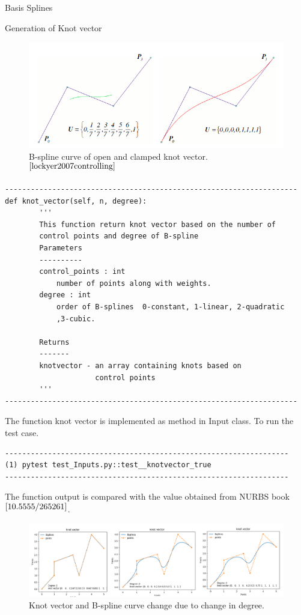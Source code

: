 \documentclass[a4paper,12pt,times]{article}
\begin{document}
\begin{section}{Basis Splines}
\begin{subsection}{Generation of Knot vector}
\begin{figure}[h!]
\centering
\includegraphics[width=0.75\linewidth]{knot_vector_clamped_unclamped.png}
\caption{B-spline curve of open and clamped knot vector.$^{\cite{lockyer2007controlling}}$}
\label{fig:B-spline curve of evenly space open clamped knot vector}
\end{figure}
\begin{verbatim} 
--------------------------------------------------------------------
def knot_vector(self, n, degree):
        '''
        This function return knot vector based on the number of
        control points and degree of B-spline
        Parameters
        ----------
        control_points : int
            number of points along with weights.
        degree : int
            order of B-splines  0-constant, 1-linear, 2-quadratic
            ,3-cubic.

        Returns
        -------
        knotvector - an array containing knots based on 
        			 control points
        '''
--------------------------------------------------------------------
\end{verbatim}

The function knot vector is implemented as method in Input class.
To run the test case. 
\begin{verbatim} 
------------------------------------------------------------------
(1) pytest test_Inputs.py::test__knotvector_true
------------------------------------------------------------------
\end{verbatim}
The function output is compared with the value obtained from NURBS book $^{\cite{10.5555/265261}}$.


\begin{figure}[h!]
\centering
\includegraphics[width=\linewidth]{knot_vector_combined.png}
\caption{Knot vector and B-spline curve change due to change in degree.}
\label{fig:change in knot vector and B-spline curve due to change in degree}
\end{figure}


\end{subsection}
\end{section}
\end{document}
